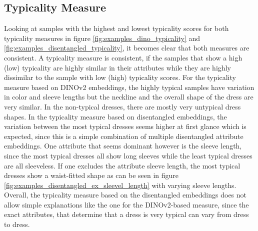 \subsection{Typicality Measure}\label{sec:results_typicality_measure}
Looking at samples with the highest and lowest typicality scores for both typicality measures in figure \ref{fig:examples_dino_typicality} and \ref{fig:examples_disentangled_typicality}, it becomes clear that both measures are consistent. A typicality measure is consistent, if the samples that show a high (low) typicality are highly similar in their attributes while they are highly dissimilar to the sample with low (high) typicality scores. For the typicality measure based on DINOv2 embeddings, the highly typical samples have variation in color and sleeve lengths but the neckline and the overall shape of the dress are very similar. In the non-typical dresses, there are mostly very untypical dress shapes. In the typicality measure based on disentangled embeddings, the variation between the most typical dresses seems higher at first glance which is expected, since this is a simple combination of multiple disentangled attribute embeddings. One attribute that seems dominant however is the sleeve length, since the most typical dresses all show long sleeves while the least typical dresses are all sleeveless. If one excludes the attribute sleeve length, the most typical dresses show a waist-fitted shape as can be seen in figure \ref{fig:examples_disentangled_ex_sleevel_length} with varying sleeve lengths. Overall, the typicality measure based on the disentangled embeddings does not allow simple explanations like the one for the DINOv2-based measure, since the exact attributes, that determine that a dress is very typical can vary from dress to dress. 

